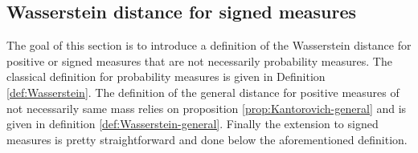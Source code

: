 \documentclass[11pt,a4paper]{article}
\newcommand{\MC}{\mathcal{M}}
\newcommand{\XF}{\mathfrak{X}}
\newcommand{\Seq}[1]{\left(#1\right)_{n\in \mathbb{N}}}
\newcommand{\brac}[1]{\left\langle#1\right\rangle}
\newtheorem{corollary}[theorem]{Corollary}
\begin{document}

\subsection{Wasserstein distance for signed measures}\label{section:Wasserstein}
The goal of this section is to introduce a definition of the Wasserstein distance for positive or signed measures that are not necessarily probability measures. The classical definition for probability measures is given in Definition \ref{def:Wasserstein}. The definition of the general distance for positive measures of not necessarily same mass relies on proposition \ref{prop:Kantorovich-general} and is given in definition \ref{def:Wasserstein-general}. Finally the extension to signed measures is pretty straightforward and done below the aforementioned definition. 
\end{document}

